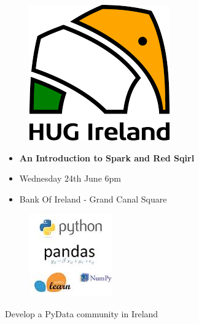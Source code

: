 \documentclass[PredictiveAnalytics101.tex]{subfiles}
\begin{document}
\begin{frame}
	\vspace{-0.5cm}
\begin{figure}
\centering
\includegraphics[width=0.4\linewidth]{images/HUGI}

\end{figure}
\Large
\begin{itemize}
\item \textbf{An Introduction to Spark and Red Sqirl }
\item Wednesday 24th June 6pm
\item Bank Of Ireland - Grand Canal Square
\end{itemize}
\end{frame}
\begin{frame}
\begin{figure}
\centering
\includegraphics[width=0.7\linewidth]{images/pydatalogocombined}
\end{figure}
Develop a PyData community in Ireland
\end{frame}
\end{document}
